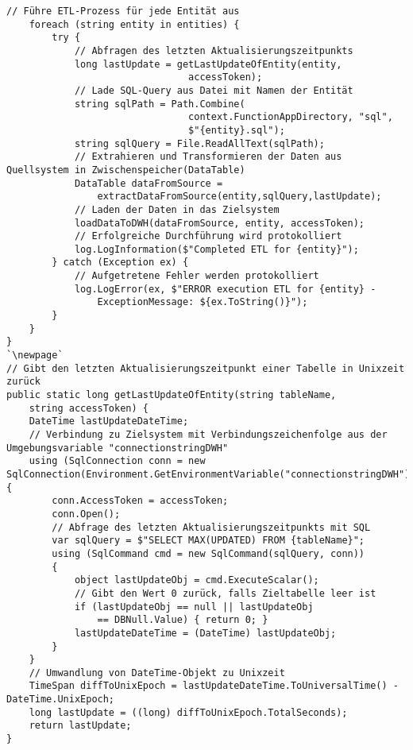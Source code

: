 \begin{lstlisting}[caption=Quellcode für die Datenintegration mit Azure Functions,captionpos=b,label={lst:azFunc},escapeinside=``]
    // Führe ETL-Prozess für jede Entität aus
    foreach (string entity in entities) {
        try {
            // Abfragen des letzten Aktualisierungszeitpunkts
            long lastUpdate = getLastUpdateOfEntity(entity, 
                                accessToken);
            // Lade SQL-Query aus Datei mit Namen der Entität
            string sqlPath = Path.Combine(
                                context.FunctionAppDirectory, "sql", 
                                $"{entity}.sql");
            string sqlQuery = File.ReadAllText(sqlPath);
            // Extrahieren und Transformieren der Daten aus Quellsystem in Zwischenspeicher(DataTable)
            DataTable dataFromSource = 
                extractDataFromSource(entity,sqlQuery,lastUpdate);
            // Laden der Daten in das Zielsystem
            loadDataToDWH(dataFromSource, entity, accessToken);
            // Erfolgreiche Durchführung wird protokolliert
            log.LogInformation($"Completed ETL for {entity}");
        } catch (Exception ex) {
            // Aufgetretene Fehler werden protokolliert
            log.LogError(ex, $"ERROR execution ETL for {entity} -
                ExceptionMessage: ${ex.ToString()}");
        }
    }
}
`\newpage`
// Gibt den letzten Aktualisierungszeitpunkt einer Tabelle in Unixzeit zurück
public static long getLastUpdateOfEntity(string tableName, 
    string accessToken) {
    DateTime lastUpdateDateTime;
    // Verbindung zu Zielsystem mit Verbindungszeichenfolge aus der Umgebungsvariable "connectionstringDWH"
    using (SqlConnection conn = new SqlConnection(Environment.GetEnvironmentVariable("connectionstringDWH"))) {
        conn.AccessToken = accessToken;
        conn.Open();
        // Abfrage des letzten Aktualisierungszeitpunkts mit SQL
        var sqlQuery = $"SELECT MAX(UPDATED) FROM {tableName}";
        using (SqlCommand cmd = new SqlCommand(sqlQuery, conn))
        {
            object lastUpdateObj = cmd.ExecuteScalar();
            // Gibt den Wert 0 zurück, falls Zieltabelle leer ist
            if (lastUpdateObj == null || lastUpdateObj 
                == DBNull.Value) { return 0; }
            lastUpdateDateTime = (DateTime) lastUpdateObj;
        }
    }
    // Umwandlung von DateTime-Objekt zu Unixzeit
    TimeSpan diffToUnixEpoch = lastUpdateDateTime.ToUniversalTime() - DateTime.UnixEpoch;
    long lastUpdate = ((long) diffToUnixEpoch.TotalSeconds);
    return lastUpdate;
}


\end{lstlisting}
